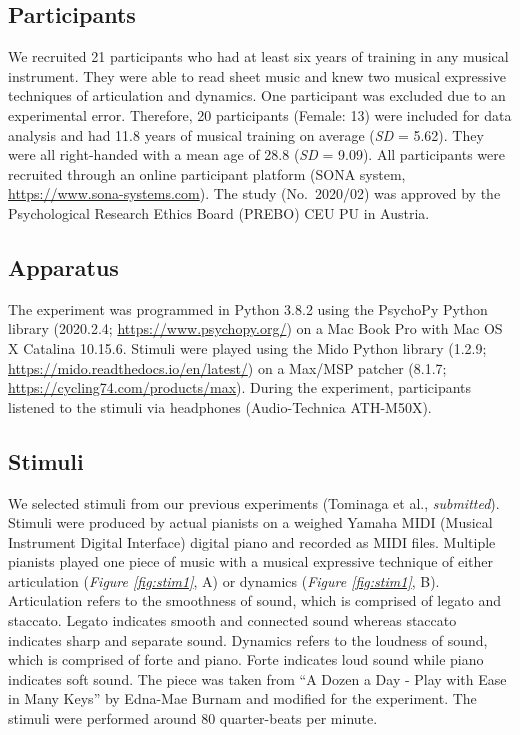 \documentclass[
  man,floatsintext]{apa6}
\begin{document}
\hypertarget{participants}{%
\subsection{Participants}\label{participants}}

We recruited 21 participants who had at least six years of training in any musical instrument. They were able to read sheet music and knew two musical expressive techniques of articulation and dynamics. One participant was excluded due to an experimental error. Therefore, 20 participants (Female: 13) were included for data analysis and had 11.8 years of musical training on average (\emph{SD} = 5.62). They were all right-handed with a mean age of 28.8 (\emph{SD} = 9.09). All participants were recruited through an online participant platform (SONA system, \url{https://www.sona-systems.com}). The study (No.~2020/02) was approved by the Psychological Research Ethics Board (PREBO) CEU PU in Austria.

\hypertarget{apparatus}{%
\subsection{Apparatus}\label{apparatus}}

The experiment was programmed in Python 3.8.2 using the PsychoPy Python library (2020.2.4; \url{https://www.psychopy.org/}) on a Mac Book Pro with Mac OS X Catalina 10.15.6. Stimuli were played using the Mido Python library (1.2.9; \url{https://mido.readthedocs.io/en/latest/}) on a Max/MSP patcher (8.1.7; \url{https://cycling74.com/products/max}). During the experiment, participants listened to the stimuli via headphones (Audio-Technica ATH-M50X).

\hypertarget{stimuli}{%
\subsection{Stimuli}\label{stimuli}}

We selected stimuli from our previous experiments (Tominaga et al., \emph{submitted}). Stimuli were produced by actual pianists on a weighed Yamaha MIDI (Musical Instrument Digital Interface) digital piano and recorded as MIDI files. Multiple pianists played one piece of music with a musical expressive technique of either articulation (\emph{Figure \ref{fig:stim1}}, A) or dynamics (\emph{Figure \ref{fig:stim1}}, B). Articulation refers to the smoothness of sound, which is comprised of legato and staccato. Legato indicates smooth and connected sound whereas staccato indicates sharp and separate sound. Dynamics refers to the loudness of sound, which is comprised of forte and piano. Forte indicates loud sound while piano indicates soft sound. The piece was taken from ``A Dozen a Day - Play with Ease in Many Keys'' by Edna-Mae Burnam and modified for the experiment. The stimuli were performed around 80 quarter-beats per minute.
\end{document}
